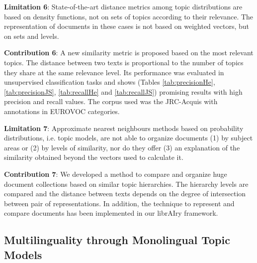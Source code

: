 \textbf{Limitation 6}: State-of-the-art distance metrics among topic distributions are based on density functions, not on sets of topics according to their relevance. The representation of documents in these cases is not based on weighted vectors, but on sets and levels.

\textbf{Contribution 6}: A new similarity metric is proposed based on the most relevant topics. The distance between two texts is proportional to the number of topics they share at the same relevance level. Its performance was evaluated in unsupervised classification tasks and shows (Tables \ref{tab:precisionHe}, \ref{tab:precisionJS}, \ref{tab:recallHe} and \ref{tab:recallJS}) promising results with high precision and recall values. The corpus used was the JRC-Acquis with annotations in EUROVOC categories.

\textbf{Limitation 7}: Approximate nearest neighbours methods based on probability distributions, i.e. topic models, are not able to organize documents (1) by subject areas or (2) by levels of similarity, nor do they offer (3) an explanation of the similarity obtained beyond the vectors used to calculate it.

\textbf{Contribution 7}: We developed a method to compare and organize huge document collections based on similar topic hierarchies. The hierarchy levels are compared and the distance between texts depends on the degree of intersection between pair of representations. In addition, the technique to represent and compare documents has been implemented in our librAIry framework.


\subsection{Multilinguality through Monolingual Topic Models}

